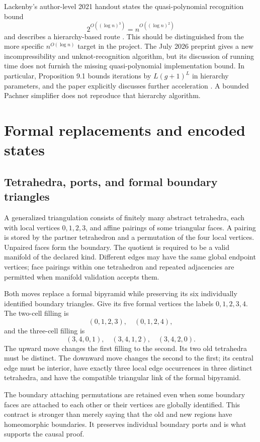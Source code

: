 Lackenby's author-level 2021 handout states the quasi-polynomial recognition
bound
\[
 2^{O((\log n)^3)}=n^{O((\log n)^2)}
\]
and describes a hierarchy-based route \cite{lackenby-talk}.
This should be distinguished from the more specific
$n^{O(\log n)}$ target in the project. The July 2026 preprint gives a new
incompressibility and unknot-recognition algorithm, but its discussion of
running time does not furnish the missing quasi-polynomial implementation
bound. In particular, Proposition 9.1 bounds iterations by $L(g+1)^L$ in
hierarchy parameters, and the paper explicitly discusses further acceleration
\cite{lackenby-2026}. A bounded Pachner simplifier does not reproduce that
hierarchy algorithm.

\section{Formal replacements and encoded states}\label{sec:model}

\subsection{Tetrahedra, ports, and formal boundary triangles}

A generalized triangulation consists of finitely many abstract tetrahedra,
each with local vertices $0,1,2,3$, and affine pairings of some triangular
faces. A pairing is stored by the partner tetrahedron and a permutation of
the four local vertices. Unpaired faces form the boundary. The quotient is
required to be a valid manifold of the declared kind. Different edges may
have the same global endpoint vertices; face pairings within one tetrahedron
and repeated adjacencies are permitted when manifold validation accepts them.

Both moves replace a formal bipyramid while preserving its six individually
identified boundary triangles. Give its five formal vertices the labels
$0,1,2,3,4$. The two-cell filling is
\[
 (0,1,2,3),\quad (0,1,2,4),
\]
and the three-cell filling is
\[
 (3,4,0,1),\quad (3,4,1,2),\quad (3,4,2,0).
\]
The upward move changes the first filling to the second. Its two old
tetrahedra must be distinct. The downward move changes the second to the
first; its central edge must be interior, have exactly three local edge
occurrences in three distinct tetrahedra, and have the compatible triangular
link of the formal bipyramid.

The boundary attaching permutations are retained even when some boundary
faces are attached to each other or their vertices are globally identified.
This contract is stronger than merely saying that the old and new regions
have homeomorphic boundaries. It preserves individual boundary ports and is
what supports the causal proof.

